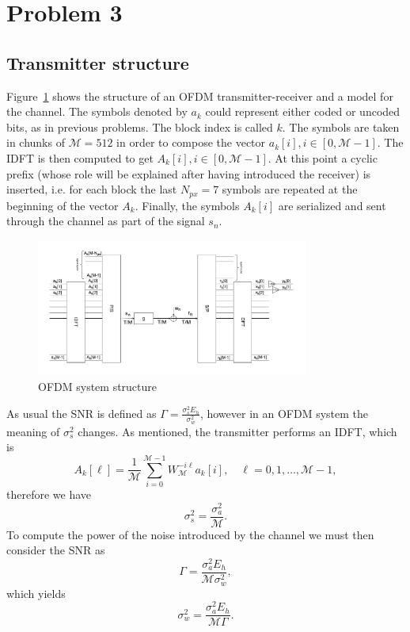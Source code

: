 \documentclass[10pt]{article}
\newcommand{\ofdM} {\mathcal{M}}
\begin{document}
\section*{Problem 3}

\subsection*{Transmitter structure}
Figure~\ref{fig:OFDM} shows the structure of an OFDM transmitter-receiver and a model for the channel. The symbols denoted by $a_k$ could represent either coded or uncoded bits, as in previous problems. The block index is called $k$. The symbols are taken in chunks of $\ofdM = 512$ in order to compose the vector $a_k[i], i \in [0, \ofdM - 1]$. The IDFT is then computed to get $A_k[i], i\in [0, \ofdM-1]$. At this point a cyclic prefix (whose role will be explained after having introduced the receiver) is inserted, i.e. for each block the last $N_{px} = 7$ symbols are repeated at the beginning of the vector $A_k$. Finally, the symbols $A_k[i]$ are serialized and sent through the channel as part of the signal $s_n$.

\begin{figure}[h!]
	\centering
	\includegraphics[width = 0.8\textwidth]{OFDM}
	\caption{OFDM system structure}
	\label{fig:OFDM}
\end{figure}
As usual the SNR is defined as $\Gamma = \frac{\sigma_s^2 E_h}{\sigma_w^2}$, however in an OFDM system the meaning of $\sigma_s^2$ changes. As mentioned, the transmitter performs an IDFT, which is
\begin{equation}
	A_k[\ell] = \frac{1}{\ofdM} \sum_{i = 0}^{\ofdM - 1} W_{\ofdM}^{-i\ell} a_k[i], \quad \ell = 0, 1, \dots, \ofdM-1,
\end{equation}
therefore we have 
\begin{equation}
	\sigma_s^2 = \dfrac{\sigma_a^2}{\ofdM}.
\end{equation}
To compute the power of the noise introduced by the channel we must then consider the SNR as
\begin{equation}
	\Gamma = \dfrac{\sigma_a^2 E_h}{\ofdM \sigma_w^2},
	\label{eq:snrOFDM}
\end{equation}
which yields
\begin{equation}
	\sigma_w^2 = \dfrac{\sigma_a^2 E_h}{\ofdM \Gamma}.
\end{equation}
\end{document}
